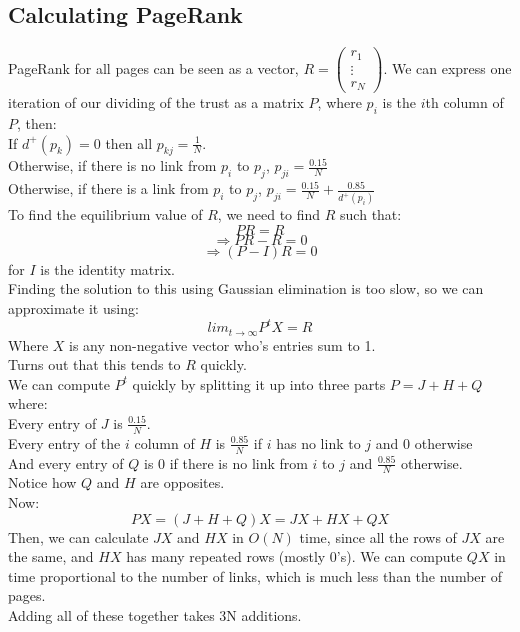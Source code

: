 \documentclass[12pt]{article}
\theoremstyle{definition}
\begin{document}
\subsection{Calculating PageRank}
PageRank for all pages can be seen as a vector, $R = \begin{pmatrix}r_1\\ \vdots\\ r_N\end{pmatrix}$. We can express one iteration of our dividing of the trust as a matrix $P$, where $p_i$ is the $i$th column of $P$, then:
\\
If $d^+(p_k) =0$ then all $p_{kj}=\frac{1}{N}$.\\
Otherwise, if there is no link from $p_i$ to $p_j$, $p_{ji} = \frac{0.15}{N}$\\
Otherwise, if there is a link from $p_i$ to $p_j$, $p_{ji} = \frac{0.15}{N} + \frac{0.85}{d^+(p_i)}$
\\ \linebreak
To find the equilibrium value of $R$, we need to find $R$ such that:
$$PR=R$$
$$ \Rightarrow PR-R = 0$$
$$ \Rightarrow (P-I)R = 0$$
for $I$ is the identity matrix.
\\ \linebreak
Finding the solution to this using Gaussian elimination is too slow, so we can approximate it using:
$$lim_{t\rightarrow \infty} P^tX=R$$
Where $X$ is any non-negative vector who's entries sum to 1. 
\\ \linebreak
Turns out that this tends to $R$ quickly.
\\ \linebreak
We can compute $P^t$ quickly by splitting it up into three parts $P = J + H + Q$ where:\\
Every entry of $J$ is $\frac{0.15}{N}$. \\
Every entry of the $i$ column of $H$ is $\frac{0.85}{N}$ if $i$ has no link to $j$ and 0 otherwise\\
And every entry of $Q$ is 0 if there is no link from $i$ to $j$ and $\frac{0.85}{N}$ otherwise. \\ \linebreak
Notice how $Q$ and $H$ are opposites. 
\\ \linebreak
Now: 
$$PX = (J + H + Q)X = JX + HX + QX$$
Then, we can calculate $JX$ and $HX$ in $O(N)$ time, since all the rows of $JX$ are the same, and $HX$ has many repeated rows (mostly 0's). We can compute $QX$ in time proportional to the number of links, which is much less than the number of pages.
\\ \linebreak
Adding all of these together takes 3N additions. 
\\ \linebreak
\end{document}

